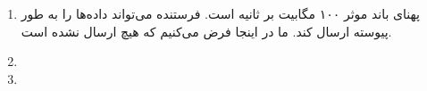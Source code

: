 \begin{boxK}
    \begin{enumerate}
        \item 
        پهنای باند موثر ۱۰۰ مگابیت بر ثانیه است.
        فرستنده می‌تواند داده‌ها را به طور پیوسته ارسال کند.
        ما در اینجا فرض می‌کنیم که هیچ 
        ارسال نشده است.
        
        \item 


        

        \item 
        

        
    \end{enumerate}
\end{boxK}